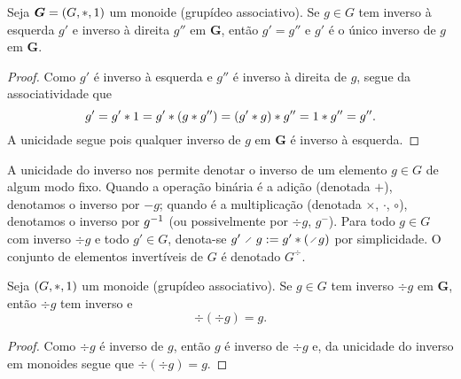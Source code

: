 \begin{proposition}
\label{prop:unicidade.inverso.grupideo}
Seja $\bm G = (G,\ast,1)$ um monoide (grupídeo associativo). Se $g \in G$ tem inverso à esquerda $g'$ e inverso à direita $g''$ em $\bm G$, então $g' = g''$ e $g'$ é o único inverso de $g$ em $\bm G$.
\end{proposition}
\begin{proof}
Como $g'$ é inverso à esquerda e $g''$ é inverso à direita de $g$, segue da associatividade que
	\begin{equation*}
	g' = g' \ast 1 = g' \ast (g \ast g'') = (g' \ast g) \ast g'' = 1 \ast g'' = g''.
	\end{equation*}
A unicidade segue pois qualquer inverso de $g$ em $\bm G$ é inverso à esquerda.
\end{proof}

\begin{notation}
A unicidade do inverso nos permite denotar o inverso de um elemento $g \in G$ de algum modo fixo. Quando a operação binária é a adição (denotada $+$), denotamos o inverso por $-g$; quando é a multiplicação (denotada $\times$, $\cdot$, $\circ$), denotamos o inverso por $g^{-1}$ (ou possivelmente por $\div g$, $g^{-}$). Para todo $g \in G$ com inverso $\div g$ e todo $g' \in G$, denota-se $g' \div g := g' \opb (\div g)$ por simplicidade. O conjunto de elementos invertíveis de $G$ é denotado $G^{\div}$.
\end{notation}

\begin{proposition}
Seja $(G,\ast,1)$ um monoide (grupídeo associativo). Se $g \in G$ tem inverso $\div g$ em $\bm G$, então $\div g$ tem inverso e
	\begin{equation*}
	\div(\div g) = g.
	\end{equation*}
\end{proposition}
\begin{proof}
Como $\div g$ é inverso de $g$, então $g$ é inverso de $\div g$ e, da unicidade do inverso em monoides segue que $\div(\div g) = g$.
\end{proof}

